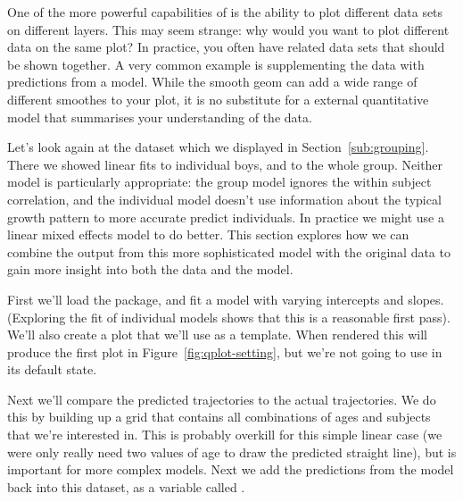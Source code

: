 One of the more powerful capabilities of \ggplot is the ability to plot different data sets on different layers.  This may seem strange: why would you want to plot different data on the same plot?  In practice, you often have related data sets that should be shown together.  A very common example is supplementing the data with predictions from a model.  While the smooth geom can add a wide range of different smoothes to your plot, it is no substitute for a external quantitative model that summarises your understanding of the data.

Let's look again at the  dataset which we displayed in Section~\ref{sub:grouping}.  There we showed linear fits to individual boys, and to the whole group.  Neither model is particularly appropriate: the group model ignores the within subject correlation, and the individual model doesn't use information about the typical growth pattern to more accurate predict individuals.  In practice we might use a linear mixed effects model to do better.  This section explores how we can combine the output from this more sophisticated model with the original data to gain more insight into both the data and the model.

First we'll load the  package, and fit a model with varying intercepts and slopes.  (Exploring the fit of individual models shows that this is a reasonable first pass).  We'll also create a plot that we'll use as a template.  When rendered this will produce the first plot in Figure~\ref{fig:qplot-setting}, but we're not going to use in its default state.

% 


Next we'll compare the predicted trajectories to the actual trajectories.  We do this by building up a grid that contains all combinations of ages and subjects that we're interested in.  This is probably overkill for this simple linear case (we were only really need two values of age to draw the predicted straight line), but is important for more complex models.  Next we add the predictions from the model back into this dataset, as a variable called .  

% 
% 



